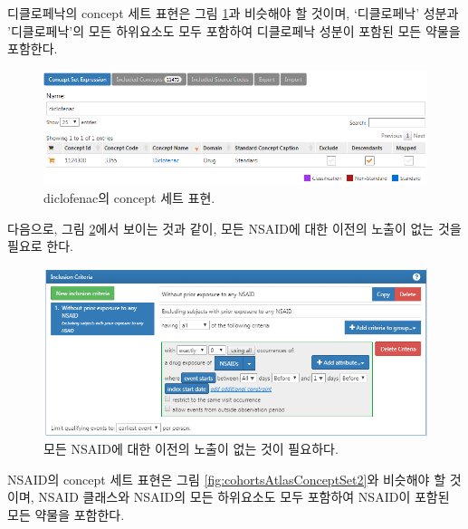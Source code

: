 \documentclass[11pt]{book}
\theoremstyle{definition}
\theoremstyle{definition}
\theoremstyle{definition}
\theoremstyle{remark}
\begin{document}
디클로페낙의 concept 세트 표현은 그림
\ref{fig:cohortsAtlasConceptSet1}과 비슷해야 할 것이며, `디클로페낙'
성분과 '디클로페낙'의 모든 하위요소도 모두 포함하여 디클로페낙 성분이
포함된 모든 약물을 포함한다.

\begin{figure}

{\centering \includegraphics[width=1\linewidth]{images/SuggestedAnswers/cohortsAtlasConceptSet1} 

}

\caption{diclofenac의 concept 세트 표현.}\label{fig:cohortsAtlasConceptSet1}
\end{figure}

다음으로, 그림 \ref{fig:cohortsAtlasInclusion1}에서 보이는 것과 같이,
모든 NSAID에 대한 이전의 노출이 없는 것을 필요로 한다.

\begin{figure}

{\centering \includegraphics[width=1\linewidth]{images/SuggestedAnswers/cohortsAtlasInclusion1} 

}

\caption{모든 NSAID에 대한 이전의 노출이 없는 것이 필요하다.}\label{fig:cohortsAtlasInclusion1}
\end{figure}

NSAID의 concept 세트 표현은 그림 \ref{fig:cohortsAtlasConceptSet2}와
비슷해야 할 것이며, NSAID 클래스와 NSAID의 모든 하위요소도 모두 포함하여
NSAID이 포함된 모든 약물을 포함한다.
\end{document}
